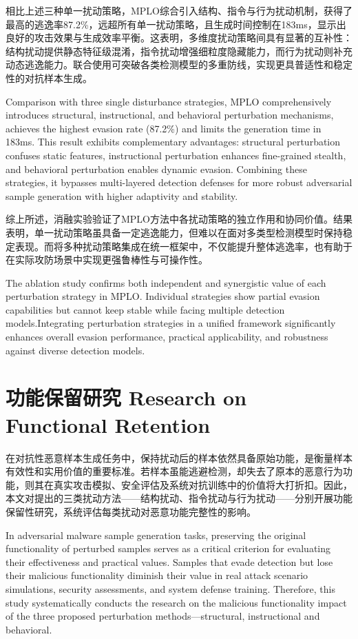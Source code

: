 相比上述三种单一扰动策略，MPLO综合引入结构、指令与行为扰动机制，获得了最高的逃逸率87.2\%，远超所有单一扰动策略，且生成时间控制在183ms，显示出良好的攻击效果与生成效率平衡。这表明，多维度扰动策略间具有显著的互补性：结构扰动提供静态特征级混淆，指令扰动增强细粒度隐藏能力，而行为扰动则补充动态逃逸能力。联合使用可突破各类检测模型的多重防线，实现更具普适性和稳定性的对抗样本生成。

Comparison with three single disturbance strategies, MPLO comprehensively introduces structural, instructional, and behavioral perturbation mechanisms, achieves the highest evasion rate (87.2\%) and limits the generation time in 183ms. This result exhibits complementary advantages: structural perturbation confuses static features, instructional perturbation enhances fine-grained stealth, and behavioral perturbation enables dynamic evasion. Combining these strategies, it bypasses multi-layered detection defenses for more robust adversarial sample generation with higher adaptivity and stability.

综上所述，消融实验验证了MPLO方法中各扰动策略的独立作用和协同价值。结果表明，单一扰动策略虽具备一定逃逸能力，但难以在面对多类型检测模型时保持稳定表现。而将多种扰动策略集成在统一框架中，不仅能提升整体逃逸率，也有助于在实际攻防场景中实现更强鲁棒性与可操作性。

The ablation study confirms both independent and synergistic value of each perturbation strategy in MPLO. Individual strategies show partial evasion capabilities but cannot keep stable while facing multiple detection models.Integrating perturbation strategies in a unified framework significantly enhances overall evasion performance, practical applicability, and robustness against diverse detection models.  

\section{功能保留研究 Research on Functional Retention}

在对抗性恶意样本生成任务中，保持扰动后的样本依然具备原始功能，是衡量样本有效性和实用价值的重要标准。若样本虽能逃避检测，却失去了原本的恶意行为功能，则其在真实攻击模拟、安全评估及系统对抗训练中的价值将大打折扣。因此，本文对提出的三类扰动方法——结构扰动、指令扰动与行为扰动——分别开展功能保留性研究，系统评估每类扰动对恶意功能完整性的影响。

In adversarial malware sample generation tasks, preserving the original functionality of perturbed samples serves as a critical criterion for evaluating their effectiveness and practical values. Samples that evade detection but lose their malicious functionality diminish their value in real attack scenario simulations, security assessments, and system defense training. Therefore, this study systematically conducts the research on the malicious functionality impact of the three proposed perturbation methods—structural, instructional and behavioral.

